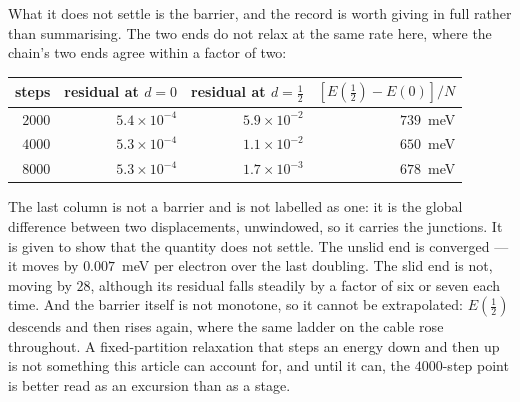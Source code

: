 \documentclass[11pt]{article}
\newcommand{\half}{\tfrac12}
\begin{document}
What it does not settle is the barrier, and the record is worth giving in full rather than
summarising. The two ends do not relax at the same rate here, where the chain's two ends agree
within a factor of two:

\begin{center}
\small
\begin{tabular}{@{}rrrr@{}}
\toprule
steps & residual at $d=0$ & residual at $d=\half$ & $[E(\half)-E(0)]/N$\\
\midrule
$2000$ & $5.4\times10^{-4}$ & $5.9\times10^{-2}$ & $739$~meV\\
$4000$ & $5.3\times10^{-4}$ & $1.1\times10^{-2}$ & $650$~meV\\
$8000$ & $5.3\times10^{-4}$ & $1.7\times10^{-3}$ & $678$~meV\\
\bottomrule
\end{tabular}
\end{center}

\noindent The last column is not a barrier and is not labelled as one: it is the global difference
between two displacements, unwindowed, so it carries the junctions. It is given to show that the
quantity does not settle. The unslid end is converged --- it moves by $0.007$~meV per electron over the last
doubling. The slid end is not, moving by $28$, although its residual falls steadily by a factor of
six or seven each time. And the barrier itself is not monotone, so it cannot be extrapolated:
$E(\half)$ descends and then rises again, where the same ladder on the cable rose throughout. A
fixed-partition relaxation that steps an energy down and then up is not something this article can
account for, and until it can, the $4000$-step point is better read as an excursion than as a stage.
\end{document}
